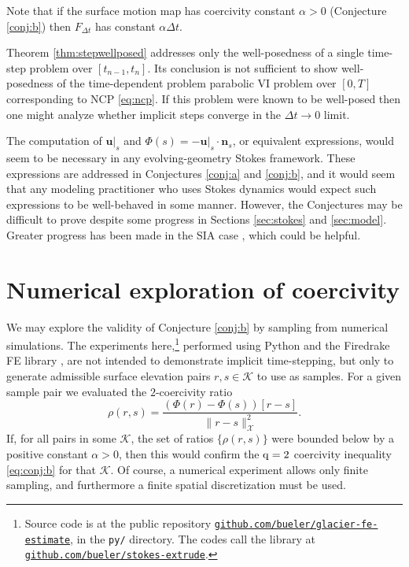 \documentclass[hidelinks,onefignum,onetabnum,final]{siamart220329}  %
\newcommand{\bn}{\mathbf{n}}
\newcommand{\bu}{\mathbf{u}}
\newcommand{\cK}{\mathcal{K}}
\newcommand{\cX}{\mathcal{X}}
\newcommand{\qq}{{\text{\textnormal{q}}}}
\begin{document}
Note that if the surface motion map has coercivity constant $\alpha>0$ (Conjecture \ref{conj:b}) then $F_{\Delta t}$ has constant $\alpha\Delta t$.

Theorem \ref{thm:stepwellposed} addresses only the well-posedness of a single time-step problem over $[t_{n-1},t_n]$.  Its conclusion is not sufficient to show well-posedness of the time-dependent problem parabolic VI problem over $[0,T]$ corresponding to NCP \eqref{eq:ncp}.  If this problem were known to be well-posed then one might analyze whether implicit steps converge in the $\Delta t\to 0$ limit.

The computation of $\bu|_s$ and $\Phi(s)=-\bu|_s\cdot \bn_s$, or equivalent expressions, would seem to be necessary in any evolving-geometry Stokes framework.  These expressions are addressed in Conjectures \ref{conj:a} and \ref{conj:b}, and it would seem that any modeling practitioner who uses Stokes dynamics would expect such expressions to be well-behaved in some manner.  However, the Conjectures may be difficult to prove despite some progress in Sections \ref{sec:stokes} and \ref{sec:model}.  Greater progress has been made in the SIA case \cite{Calvoetal2003,JouvetBueler2012,PiersantiTemam2023}, which could be helpful.


\section{Numerical exploration of coercivity} \label{sec:numerical}

We may explore the validity of Conjecture \ref{conj:b} by sampling from numerical simulations.  The experiments here,\footnote{Source code is at the public repository \href{https://github.com/bueler/glacier-fe-estimate}{\texttt{github.com/bueler/glacier-fe-estimate}}, in the \texttt{py/} directory.  The codes call the library at \href{https://github.com/bueler/stokes-extrude}{\texttt{github.com/bueler/stokes-extrude}}.} performed using Python and the Firedrake FE library \cite{Hametal2023}, are not intended to demonstrate implicit time-stepping, but only to generate admissible surface elevation pairs $r,s\in\cK$ to use as samples.  For a given sample pair we evaluated the $2$-coercivity ratio
\begin{equation}
\rho(r,s) = \frac{\left(\Phi(r) - \Phi(s)\right)[r-s]}{\|r-s\|_{\cX}^2}. \label{eq:Phiratio}
\end{equation}
If, for all pairs in some $\cK$, the set of ratios $\{\rho(r,s)\}$ were bounded below by a positive constant $\alpha>0$, then this would confirm the $\qq=2$ coercivity inequality \eqref{eq:conj:b} for that $\cK$.  Of course, a numerical experiment allows only finite sampling, and furthermore a finite spatial discretization must be used.
\end{document}
